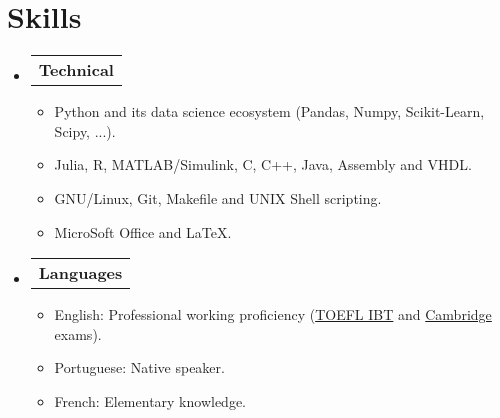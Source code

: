 \section{Skills}

\begin{itemize}[leftmargin=0.15in, label={}] %
  \item   \begin{tabular*}{0.2\textwidth}{l} \textbf{Technical} \end{tabular*}\vspace{-7pt} %
          \begin{itemize} %
            \item Python and its data science ecosystem (Pandas, Numpy, Scikit-Learn, Scipy, ...).
            \item Julia, R, MATLAB/Simulink, C, C++, Java, Assembly and VHDL.
            \item GNU/Linux, Git, Makefile and UNIX Shell scripting.
            \item MicroSoft Office and \LaTeX.
          \end{itemize}\vspace{-5pt}
  \item   \begin{tabular*}{0.2\textwidth}{l} \textbf{Languages} \end{tabular*}\vspace{-6pt} %
          \begin{itemize}
            \item English: Professional working proficiency (\href{https://github.com/tapyu/tapyu/blob/master/cv/Latex/figs/Toefl.pdf}{TOEFL IBT} and \href{https://github.com/tapyu/tapyu/blob/master/cv/Latex/figs/Cambridge\%20FCE.pdf}{Cambridge} exams).
            \item Portuguese: Native speaker.
            \item French: Elementary knowledge.
          \end{itemize}
\end{itemize} %
